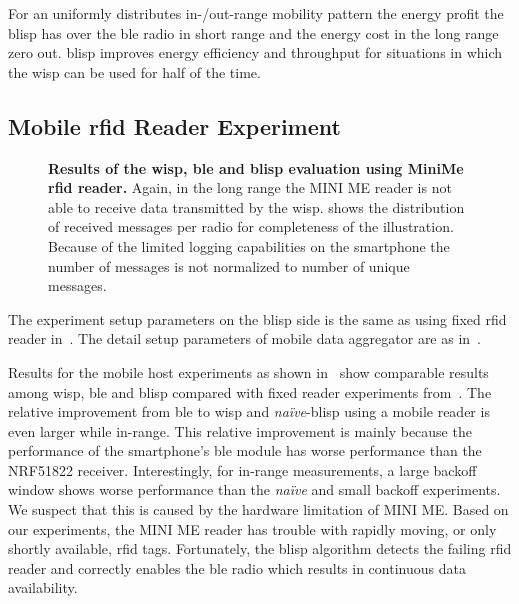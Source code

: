 \documentclass[conference,letterpaper,twoside,final,10pt]{IEEEtran}
\begin{document}
For an uniformly distributes in-/out-range mobility pattern the energy profit the \ac{blisp} has over the \ac{ble} radio in short range and the energy cost in the long range zero out.
\ac{blisp} improves energy efficiency and throughput for situations in which the \ac{wisp} can be used for half of the time.

\subsection{Mobile \acs{rfid} Reader Experiment}
\label{sec:experiments/minime}

\begin{figure}
	\centering
\caption{\textbf{Results of the \acs{wisp}, \acs{ble} and \acs{blisp} evaluation using MiniMe \acs{rfid} reader.}
	Again, in the long range the MINI ME reader is not able to receive data transmitted by the \acs{wisp}. 
	 shows the distribution of received messages per radio for completeness of the illustration.
	Because of the limited logging capabilities on the smartphone the number of messages is not normalized to number of unique messages.
	}
	\label{fig:minime_results}
\end{figure}

The experiment setup parameters on the \ac{blisp} side is the same as using fixed \ac{rfid} reader in~.
The detail setup parameters of mobile data aggregator are as in~.

Results for the mobile host experiments as shown in~ show comparable results among \ac{wisp}, \ac{ble} and \ac{blisp} compared with fixed reader experiments from~.
The relative improvement from \ac{ble} to \ac{wisp} and \emph{na\"ive}-\ac{blisp} using a mobile reader is even larger while in-range.
This relative improvement is mainly because the performance of the smartphone's \ac{ble} module has worse performance than the NRF51822 receiver.
Interestingly, for in-range measurements, a large backoff window shows worse performance than the \emph{na\"ive} and small backoff experiments.
We suspect that this is caused by the hardware limitation of MINI ME.
Based on our experiments, the MINI ME reader has trouble with rapidly moving, or only shortly available, \ac{rfid} tags.
Fortunately, the \ac{blisp} algorithm detects the failing \ac{rfid} reader and correctly enables the \ac{ble} radio which results in continuous data availability.
\end{document}
